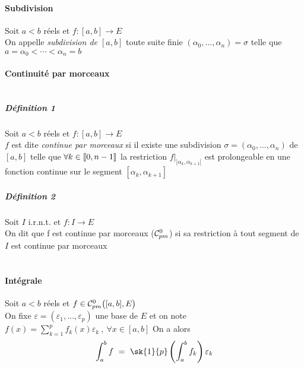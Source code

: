     \paragraph{Subdivision}
        Soit $a<b$ réels et $f:[a,b]\rightarrow E$ 
        \\ On appelle \emph{subdivision de $[a,b]$} toute suite finie $(\alpha_0 , \dots , \alpha_n ) = \sigma$ telle que 
        $a=\alpha_0 < \cdots <\alpha_n = b$\trait \vspace*{-1cm}
    \paragraph{Continuité par morceaux}
    ${}$\vspace{-0.7cm}\\\traitd
    \subparagraph{Définition 1}
        Soit $a<b$ réels et $f:[a,b]\rightarrow E$ 
        \\ $f$ est dite \emph{continue par morceaux} si il existe une subdivision $\sigma = (\alpha_0 ,\dots ,\alpha_n)$ de $[a,b]$ 
        telle que $\forall k\in {\llbracket 0,n-1 \rrbracket}$ la restriction $f|_{]\alpha_k , \alpha_{k+1}[} $ est prolongeable en une fonction continue sur le 
        segment $[\alpha_k , \alpha_{k+1}]$ \trait \newpage \traitd
    \subparagraph{Définition 2}
        Soit $I$ i.r.n.t. et $f:I\rightarrow E$ \\
        On dit que f est continue par morceaux (${\mathcal{C}_{pm}^0}$) si sa restriction à tout segment de $I$ est continue par morceaux \trait
    \vspace*{0.5cm} \\  \\ \traitd
    \paragraph{Intégrale}
        Soit $a<b$ réels et $f\in{\mathcal{C}_{pm}^0} \big( [a,b],E \big)$ \\On fixe $\varepsilon = (\varepsilon_1 , \dots , \varepsilon_p)$ une base de $E$ et
        on note $f(x) = \sum_{k=1}^p f_k(x) \varepsilon_k ~,~\forall x\in [a,b]$ On a alors 
        \[ \int_a^b f ~=~ \sk{1}{p} \left( \int_a^b f_k \right) \varepsilon_k \] \vspace*{-0.7cm}\trait
